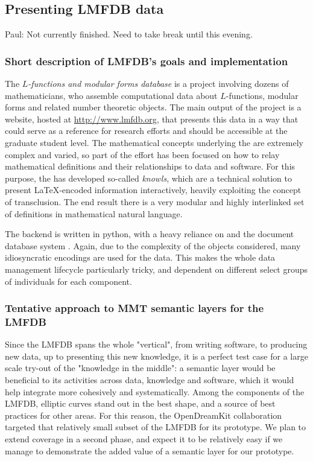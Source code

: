 \subsection{Presenting LMFDB data}
Paul: Not currently finished. Need to take break until this evening.
\subsubsection{Short description of LMFDB's goals and implementation}
The \emph{$L$-functions and modular forms database} is a project involving dozens of  mathematicians, who assemble computational data about $L$-functions, modular  forms and related number theoretic objects. The main output of the project is a website, hosted at \url{http://www.lmfdb.org}, that presents this data in a way that could serve as a reference for research efforts and should be accessible at the graduate student level.  The mathematical concepts underlying the \LMFDB are extremely complex and varied, so part of the effort has been focused on how to relay mathematical definitions and their relationships to data and software. For this purpose, the \LMFDB has developed so-called \emph{knowls}, which are a technical solution to present \LaTeX-encoded information interactively, heavily exploiting the concept of transclusion. The end result there is a very modular and highly interlinked set of definitions in mathematical natural language. 
 
The \LMFDB backend is written in \textsf{python}, with a heavy reliance on \Sage and the document database system \Mongo \cite{lmfdb-repo}. Again, due to the complexity of the objects considered, many idiosyncratic encodings are used for the data. This makes the whole data management lifecycle particularly tricky, and dependent on different select groups of individuals for each component. 

\subsubsection{Tentative approach to MMT semantic layers for the LMFDB}
Since the LMFDB spans the whole "vertical", from writing software, to producing new data, up to presenting this new knowledge,  it is a perfect test case for a large scale try-out of the "knowledge in the middle": a semantic layer would be beneficial to its activities across data, knowledge and software, which it would help integrate more cohesively and systematically. Among the components of the LMFDB, elliptic curves stand out in the best shape, and a source of best practices for other areas. For this reason, the OpenDreamKit collaboration targeted that relatively small subset of the LMFDB for its prototype. We plan to extend coverage in a second phase, and expect it to be relatively easy if we manage to demonstrate the added value of a semantic layer for our prototype. 

